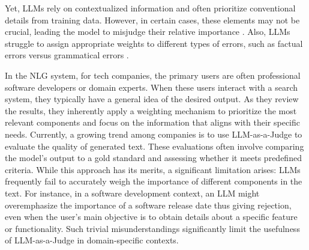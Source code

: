 
Yet, LLMs rely on contextualized information and often prioritize conventional details from training data. However, in certain cases, these elements may not be crucial, leading the model to misjudge their relative importance 
\cite{petroni2019language,jiang2020can,lin2021truthfulqa}.
Also, LLMs struggle to assign appropriate weights to different types of errors, such as factual errors versus grammatical errors 
\cite{sai2022survey,chiang2023can,zheng2023judging}.



In the NLG system, for tech companies, the primary users are often professional software developers or domain experts. When these users interact with a search system, they typically have a general idea of the desired output. As they review the results, they inherently apply a weighting mechanism to prioritize the most relevant components and focus on the information that aligns with their specific needs. Currently, a growing trend among companies is to use LLM-as-a-Judge to evaluate the quality of generated text. These evaluations often involve comparing the model’s output to a gold standard and assessing whether it meets predefined criteria. While this approach has its merits, a significant limitation arises: LLMs frequently fail to accurately weigh the importance of different components in the text\cite{petroni2019language,jiang2020can,lin2021truthfulqa}. For instance, in a software development context, an LLM might overemphasize the importance of a software release date thus giving rejection, even when the user's main objective is to obtain details about a specific feature or functionality.
Such trivial misunderstandings significantly limit the usefulness of LLM-as-a-Judge in domain-specific contexts. 

